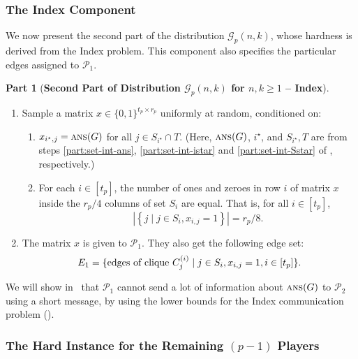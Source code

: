 \documentclass[11pt]{article}
\theoremstyle{definition}
\newenvironment{ourbox}{\begin{mdframed}[hidealllines=false,innerleftmargin=10pt,backgroundcolor=white!10,innertopmargin=5pt,innerbottommargin=5pt,roundcorner=10pt]}{\end{mdframed}}
\newtheorem{mddistributionpart}{Part}
\newenvironment{Part}{\begin{ourbox}\begin{mddistributionpart}}{
		\end{mddistributionpart}
\end{ourbox}}
\renewcommand{\geq}{\geqslant}
\newcommand{\card}[1]{\left\vert{#1}\right\vert}
\newcommand{\set}[1]{\ensuremath{\left\{ #1 \right\}}}
\newcommand{\player}[1]{\ensuremath{\mathcal{P}_{#1}}}
\newcommand{\cG}{\ensuremath{\mathcal{G}}}
\newcommand{\cliqnum}[2]{\ensuremath{C^{(#1)}_{#2}}}
\newcommand{\ans}{\ensuremath{\textnormal{\textsc{ans}}}}
\newcommand{\istar}{\ensuremath{i^{\star}}}
\begin{document}
	
	
	\subsubsection{The Index Component}

	We now present the second part of the distribution $\cG_p(n,k)$, whose hardness is derived from the Index problem. This component also specifies the particular edges assigned to $\player{1}$.

		\begin{Part}[\textbf{Second Part of Distribution $\cG_p(n,k)$ for $n, k \geq 1$ -- Index}]\label{distpart:index}
		~
		\noindent
		\begin{enumerate}[label=$(\roman*)$]
		\item Sample a matrix $x \in \{0,1\}^{t_p \times r_p}$ uniformly at random, conditioned on:
		\begin{enumerate}
			\item  $x_{\istar, j} = \ans(G)$ for all $j \in S_{\istar} \cap T$.  (Here, $\ans(G)$, $\istar$, and $S_{\istar}, T$ are from steps \ref{part:set-int-ans}, \ref{part:set-int-istar} and \ref{part:set-int-Sstar} of , respectively.) \label{part:index-one}
			
			\item For each $i \in [t_p]$, the number of ones and zeroes in row $i$ of matrix $x$ inside the $r_p/4$ columns of set $S_i$ are equal. That is, for all $i \in [t_p]$,  \[
			\card{\set{j \mid j \in S_{i}, x_{i,j} = 1}} = r_p/8.  
			\]
		\end{enumerate}
		
		\item 	The matrix $x$ is given to $\player{1}$. They also get the following edge set:
		\[
		E_1 = \{\textnormal{edges of clique $\cliqnum{i}{j}$} \mid j \in S_i, x_{i, j} = 1, i \in [t_p]\}.
		\]
		\end{enumerate}
		\end{Part} 

	We will show in~ that $\player{1}$ cannot send a lot of information about $\ans(G)$ to $\player{2}$ using a short message, by using the lower bounds for the Index communication problem ().

	
	\subsubsection{The Hard Instance for the Remaining $(p-1)$ Players}
	
\end{document}
